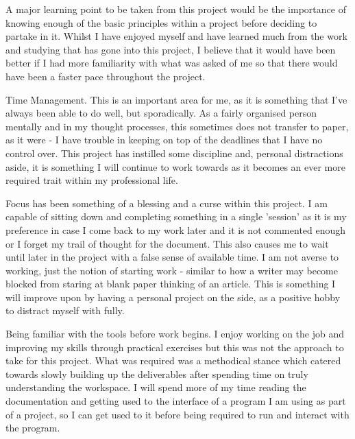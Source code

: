 A major learning point to be taken from this project would be the importance of
knowing enough of the basic principles within a project before deciding to
partake in it.  Whilst I have enjoyed myself and have learned much from the
work and studying that has gone into this project, I believe that it would have
been better if I had more familiarity with what was asked of me so that there
would have been a faster pace throughout the project.

Time Management.  This is an important area for me, as it is something that
I've always been able to do well, but sporadically.  As a fairly organised
person mentally and in my thought processes, this sometimes does not transfer
to paper, as it were - I have trouble in keeping on top of the deadlines that
I have no control over.  This project has instilled some discipline and,
personal distractions aside, it is something I will continue to work towards
as it becomes an ever more required trait within my professional life.

Focus has been something of a blessing and a curse within this project.  I am
capable of sitting down and completing something in a single 'session' as it
is my preference in case I come back to my work later and it is not commented
enough or I forget my trail of thought for the document.  This also causes me
to wait until later in the project with a false sense of available time.  I am
not averse to working, just the notion of starting work - similar to how a
writer may become blocked from staring at blank paper thinking of an article.
This is something I will improve upon by having a personal project on the side,
as a positive hobby to distract myself with fully.

Being familiar with the tools before work begins.  I enjoy working on the job
and improving my skills through practical exercises but this was not the
approach to take for this project.  What was required was a methodical stance
which catered towards slowly building up the deliverables after spending time
on truly understanding the workspace.  I will spend more of my time reading the
documentation and getting used to the interface of a program I am using as part
of a project, so I can get used to it before being required to run and interact
with the program.
